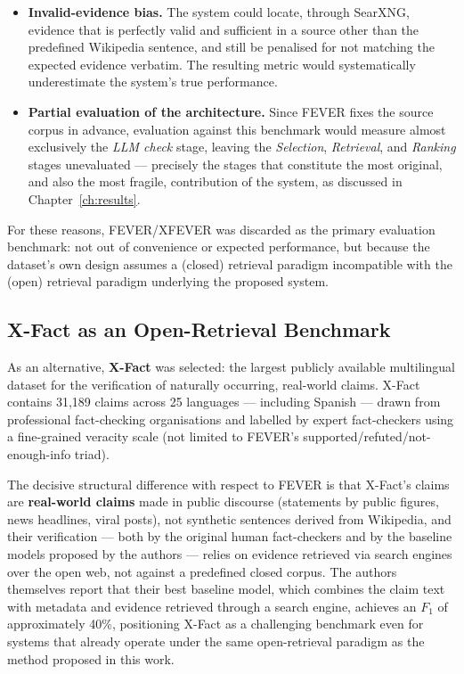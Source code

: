\begin{itemize}
    \item \textbf{Invalid-evidence bias.} The system could locate,
    through SearXNG, evidence that is perfectly valid and sufficient
    in a source other than the predefined Wikipedia sentence, and
    still be penalised for not matching the expected evidence
    verbatim. The resulting metric would systematically underestimate
    the system's true performance.
    \item \textbf{Partial evaluation of the architecture.} Since
    FEVER fixes the source corpus in advance, evaluation against this
    benchmark would measure almost exclusively the \textit{LLM check}
    stage, leaving the \textit{Selection}, \textit{Retrieval}, and
    \textit{Ranking} stages unevaluated --- precisely the stages that
    constitute the most original, and also the most fragile,
    contribution of the system, as discussed in
    Chapter~\ref{ch:results}.
\end{itemize}

For these reasons, FEVER/XFEVER was discarded as the primary
evaluation benchmark: not out of convenience or expected performance,
but because the dataset's own design assumes a (closed) retrieval
paradigm incompatible with the (open) retrieval paradigm underlying
the proposed system.

\subsection{X-Fact as an Open-Retrieval Benchmark}
\label{subsec:xfact}

As an alternative, \textbf{X-Fact} \cite{gupta2021xfact} was
selected: the largest publicly available multilingual dataset for
the verification of naturally occurring, real-world claims. X-Fact
contains 31,189 claims across 25 languages --- including Spanish ---
drawn from professional fact-checking organisations and labelled by
expert fact-checkers using a fine-grained veracity scale (not limited
to FEVER's supported/refuted/not-enough-info triad).

The decisive structural difference with respect to FEVER is that
X-Fact's claims are \textbf{real-world claims} made in public
discourse (statements by public figures, news headlines, viral
posts), not synthetic sentences derived from Wikipedia, and their
verification --- both by the original human fact-checkers and by the
baseline models proposed by the authors --- relies on evidence
retrieved via search engines over the open web, not against a
predefined closed corpus. The authors themselves report that their
best baseline model, which combines the claim text with metadata and
evidence retrieved through a search engine, achieves an $F_1$ of
approximately 40\%, positioning X-Fact as a challenging benchmark
even for systems that already operate under the same open-retrieval
paradigm as the method proposed in this work.

